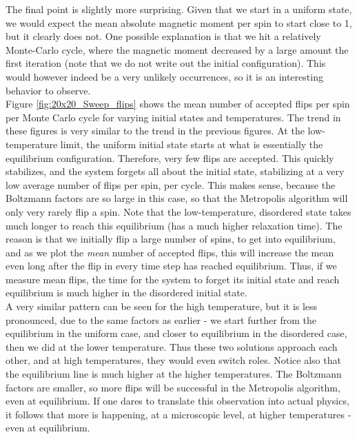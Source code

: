 \documentclass[a4paper, 10pt]{article}
\begin{document}
\linebreak
The final point is slightly more surprising. Given that we start in a uniform state, we would expect the mean absolute magnetic moment per spin to start close to 1, but it clearly does not. One possible explanation is that we hit a relatively Monte-Carlo cycle, where the magnetic moment decreased by a large amount the first iteration (note that we do not write out the initial configuration). This would however indeed be a very unlikely occurrences, so it is an interesting behavior to observe. \\
\linebreak
Figure \ref{fig:20x20_Sweep_flips} shows the mean number of accepted flips per spin per Monte Carlo cycle for varying initial states and temperatures. The trend in these figures is very similar to the trend in the previous figures. At the low-temperature limit, the uniform initial state starts at what is essentially the equilibrium configuration. Therefore, very few flips are accepted. This quickly stabilizes, and the system forgets all about the initial state, stabilizing at a very low average number of flips per spin, per cycle. This makes sense, because the Boltzmann factors are so large in this case, so that the Metropolis algorithm will only very rarely flip a spin. Note that the low-temperature, disordered state takes much longer to reach this equilibrium (has a much higher relaxation time). The reason is that we initially flip a large number of spins, to get into equilibrium, and as we plot the \textit{mean} number of accepted flips, this will increase the mean even long after the flip in every time step has reached equilibrium. Thus, if we measure mean flips, the time for the system to forget its initial state and reach equilibrium is much higher in the disordered initial state.\\
\linebreak
A very similar pattern can be seen for the high temperature, but it is less pronounced, due to the same factors as earlier - we start further from the equilibrium in the uniform case, and closer to equilibrium in the disordered case, then we did at the lower temperature. Thus these two solutions approach each other, and at high temperatures, they would even switch roles. Notice also that the equilibrium line is much higher at the higher temperatures. The Boltzmann factors are smaller, so more flips will be successful in the Metropolis algorithm, even at equilibrium. If one dares to translate this observation into actual physics, it follows that more is happening, at a microscopic level, at higher temperatures - even at equilibrium.\\
\end{document}
